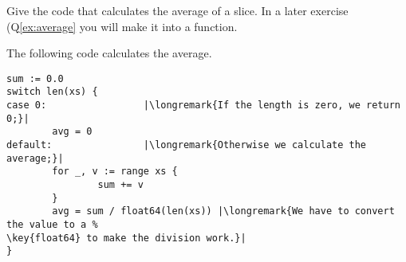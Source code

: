 \begin{Exercise}[title={Average},difficulty=4]
\label{ex:average no func}
\Question\label{ex:average no func q1} Give the code
that calculates the average of a  slice. In
a later exercise (Q\ref{ex:average} you will make it into
a function.
\end{Exercise}

\begin{Answer}
\Question The following code calculates the average.
\begin{lstlisting}
sum := 0.0 
switch len(xs) {
case 0:                 |\longremark{If the length is zero, we return 0;}|
        avg = 0
default:                |\longremark{Otherwise we calculate the average;}|
        for _, v := range xs {
                sum += v
        }
        avg = sum / float64(len(xs)) |\longremark{We have to convert the value to a %
\key{float64} to make the division work.}|
}
\end{lstlisting}
\showremarks
\end{Answer}
